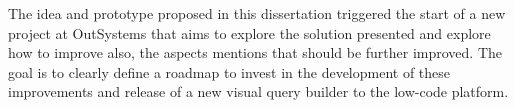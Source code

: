 \begin{enumerate}
The idea and prototype proposed in this dissertation triggered the start of a new project at OutSystems that aims to explore the solution presented and explore how to improve also, the aspects mentions that should be further improved. The goal is to clearly define a roadmap to invest in the development of these improvements and release of a new visual query builder to the low-code platform.

\end{enumerate}